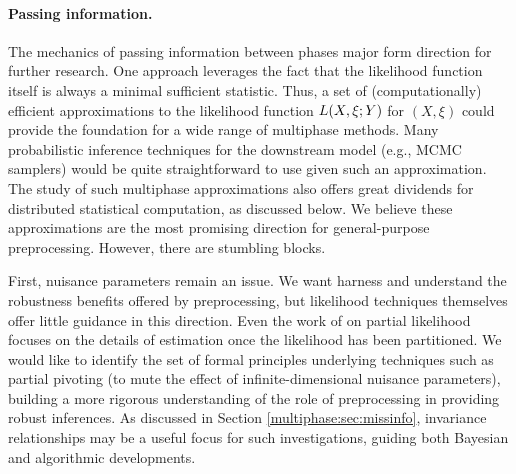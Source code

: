 
\paragraph{Passing information.}
The mechanics of passing information between phases major form direction for further research.
One approach leverages the fact that the likelihood function itself is always a minimal sufficient statistic.
Thus, a set of (computationally) efficient approximations to the likelihood function $L(X, \xi; Y)$ for $(X, \xi)$ could provide the foundation for a wide range of multiphase methods.
Many probabilistic inference techniques for the downstream model (e.g., MCMC samplers) would be quite straightforward to use given such an approximation.
The study of such multiphase approximations also offers great dividends for distributed statistical computation, as discussed below.
We believe these approximations are the most promising direction for general-purpose preprocessing.
However, there are stumbling blocks.

First, nuisance parameters remain an issue.
We want harness and understand the robustness benefits offered by preprocessing, but likelihood techniques themselves offer little guidance in this direction.
Even the work of \citet{Cox1975} on partial likelihood focuses on the details of estimation once the likelihood has been partitioned.
We would like to identify the set of formal principles underlying techniques such as partial pivoting (to mute the effect of infinite-dimensional nuisance parameters), building a more rigorous understanding of the role of preprocessing in providing robust inferences.
As discussed in Section \ref{multiphase:sec:missinfo}, invariance relationships may be a useful focus for such investigations, guiding both Bayesian and algorithmic developments.

